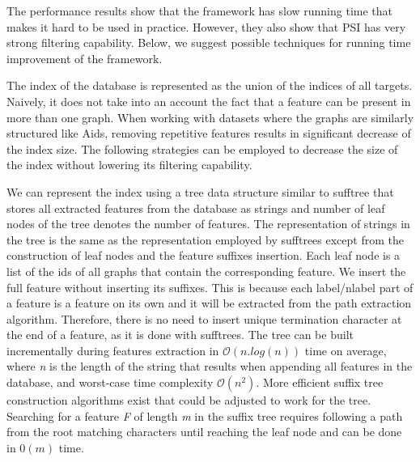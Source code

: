 \documentclass{l4proj}
\begin{document}
The performance results show that the framework has slow running time that makes it hard to be used in practice. However, they also show that PSI has very strong filtering capability. Below, we suggest possible techniques for running time improvement of the framework.

The index of the database is represented as the union of the indices of all targets. Naively, it does not take into an account the fact that a feature can be present in more than one graph. When working with datasets where the graphs are similarly structured like Aids, removing repetitive features results in significant decrease of the index size. The following strategies can be employed to decrease the size of the index without lowering its filtering capability.

We can represent the index using a \gls{tree} data structure similar to \gls{sufftree} \cite{weiner:1973} that stores all extracted features from the database as strings and number of leaf nodes of the tree denotes the number of features. The representation of strings in the tree is the same as the representation employed by \glspl{sufftree} except from the construction of leaf nodes and the feature suffixes insertion. Each leaf node is a list of the ids of all graphs that contain the corresponding feature. We insert the full feature without inserting its suffixes. This is because each label/nlabel part of a feature is a feature on its own and it will be extracted from the path extraction algorithm. Therefore, there is no need to insert unique termination character at the end of a feature, as it is done with \glspl{sufftree}. The tree can be built incrementally during features extraction in $\mathcal{O}(n.log(n))$ time on average, where \emph{n} is the length of the string that results when appending all features in the database, and worst-case time complexity $\mathcal{O}(n^{2})$. More efficient suffix tree construction algorithms exist \cite{weiner:1973, McCreight:1976, Ukkonen:1995} that could be adjusted to work for the tree. Searching for a feature \emph{F} of length \emph{m} in the suffix tree requires following a path from the root matching characters until reaching the leaf node and can be done in $\mathcal{0}(m)$ time. %

\end{document}
